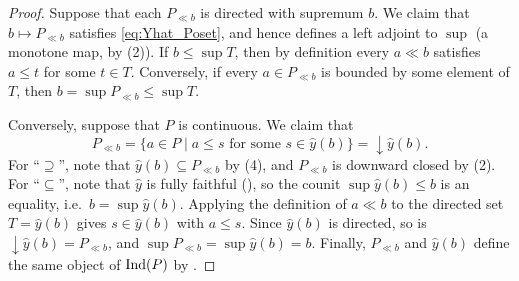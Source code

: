 
	\begin{proof}
		Suppose that each $P_{\ll b}$ is directed with supremum $b$. We claim that $b \mapsto P_{\ll b}$ satisfies \eqref{eq:Yhat_Poset}, and hence defines a left adjoint to $\sup$ (a monotone map, by (2)). If $b \leq \sup T$, then by definition every $a \ll b$ satisfies $a \leq t$ for some $t \in T$. Conversely, if every $a \in P_{\ll b}$ is bounded by some element of $T$, then $b = \sup P_{\ll b} \leq \sup T$.

		Conversely, suppose that $P$ is continuous. We claim that
		\[
			P_{\ll b} = \{a \in P \mid a \leq s \text{ for some } s \in \hat{y}(b)\} = {\downarrow}\hat{y}(b).
		\]
		For ``$\supseteq$'', note that $\hat{y}(b) \subseteq P_{\ll b}$ by (4), and $P_{\ll b}$ is downward closed by (2). For ``$\subseteq$'', note that $\hat{y}$ is fully faithful (), so the counit $\sup\hat{y}(b) \leq b$ is an equality, i.e.\ $b = \sup \hat{y}(b)$. Applying the definition of $a \ll b$ to the directed set $T = \hat{y}(b)$ gives $s \in \hat{y}(b)$ with $a \leq s$. Since $\hat{y}(b)$ is directed, so is ${\downarrow}\hat{y}(b) = P_{\ll b}$, and $\sup P_{\ll b} = \sup \hat{y}(b) = b$. Finally, $P_{\ll b}$ and $\hat{y}(b)$ define the same object of $\operatorname{Ind}(P)$ by .
	\end{proof}

